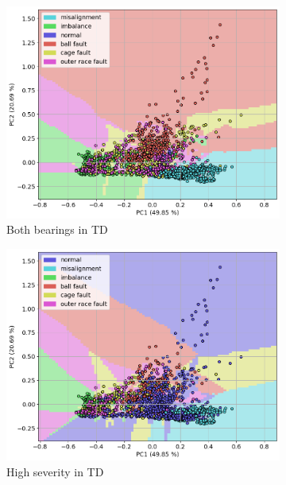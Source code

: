 \documentclass{llncs}
\begin{document}
\begin{figure}
	\centering
     \begin{subfigure}[b]{0.45\textwidth}
         \centering
         \includegraphics[width=\textwidth]{fig/scatter-mafaulda/td-all-bearings.png}
         \caption{Both bearings in TD}
     \end{subfigure}
     \hfill
     \begin{subfigure}[b]{0.45\textwidth}
         \centering
         \includegraphics[width=\textwidth]{fig/scatter-mafaulda/td-severity.png}
         \caption{High severity in TD}
     \end{subfigure}
     \hfill
     \begin{subfigure}[b]{0.45\textwidth}

\end{subfigure}
\end{figure}
\end{document}
